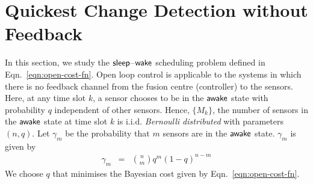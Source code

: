 \documentclass[journal]{IEEEtran}
\newcommand{\sleep}{{${\sf sleep }$}}
\newcommand{\wake}{{${\sf awake }$}}
\begin{document}
\section{Quickest Change Detection without Feedback}
\label{sec:quickest_change_detection_without_feedback}
In this section, we study the \sleep--${\sf wake}$ scheduling problem
defined in Eqn.~\ref{eqn:open-cost-fn}. Open loop control is applicable
to the systems in which there is no feedback channel from the fusion
centre (controller) to the sensors. Here, at any time slot $k$, a sensor
chooses to be in the {\wake} state with probability $q$ independent of
other sensors. Hence, $\{M_k\}$, the number of sensors in the {\wake}
state at time slot $k$ is i.i.d. {\em Bernoulli distributed} with
parameters $(n,q)$. Let $\gamma_m$ be the probability that $m$ sensors
are in the {\wake} state. $\gamma_m$ is given by
\begin{eqnarray}
\gamma_m & = & \binom{n}{m}q^m (1-q)^{n-m}
\end{eqnarray}
We choose $q$ that minimises the Bayesian cost given by Eqn.~\ref{eqn:open-cost-fn}.
\end{document}
